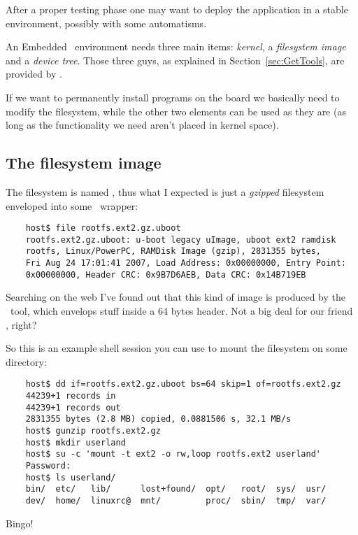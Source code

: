 After a proper testing phase one may want to deploy the application in a
stable environment, possibly with some automatisms.

An Embedded \Linux\ environment needs three main items: \emph{kernel}, a
\emph{filesystem image} and a \emph{device tree}. Those three guys, as
explained in Section~\ref{sec:GetTools}, are provided by
.

If we want to permanently install programs on the board we basically need
to modify the filesystem, while the other two elements can be used as they
are (as long as the functionality we need aren't placed in kernel space).

\subsection{The filesystem image}

    The filesystem is named , thus what I
    expected is just a \emph{gzipped}  filesystem enveloped
    into some \uBoot\ wrapper:

\begin{lstlisting}
    host$ file rootfs.ext2.gz.uboot
    rootfs.ext2.gz.uboot: u-boot legacy uImage, uboot ext2 ramdisk
    rootfs, Linux/PowerPC, RAMDisk Image (gzip), 2831355 bytes,
    Fri Aug 24 17:01:41 2007, Load Address: 0x00000000, Entry Point:
    0x00000000, Header CRC: 0x9B7D6AEB, Data CRC: 0x14B719EB
\end{lstlisting}

    Searching on the web I've found out that this kind of image is
    produced by the \mkimage\ tool, which envelops stuff inside a 64 bytes
    header. Not a big deal for our friend , right?

    So this is an example shell session you can use to mount the
    filesystem on some directory:
\begin{lstlisting}
    host$ dd if=rootfs.ext2.gz.uboot bs=64 skip=1 of=rootfs.ext2.gz
    44239+1 records in
    44239+1 records out
    2831355 bytes (2.8 MB) copied, 0.0881506 s, 32.1 MB/s
    host$ gunzip rootfs.ext2.gz
    host$ mkdir userland
    host$ su -c 'mount -t ext2 -o rw,loop rootfs.ext2 userland'
    Password:
    host$ ls userland/
    bin/  etc/   lib/      lost+found/  opt/   root/  sys/  usr/
    dev/  home/  linuxrc@  mnt/         proc/  sbin/  tmp/  var/
\end{lstlisting}
    Bingo!


